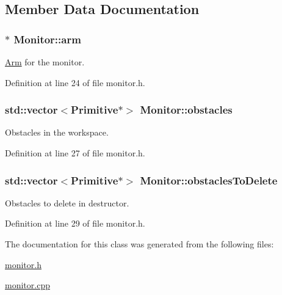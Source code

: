 \subsection{Member Data Documentation}
\subsubsection[{\texorpdfstring{arm}{arm}}]{$\ast$ Monitor\+::arm}\hypertarget{class_monitor_a8b75571f6224f999a3dc05cf9a83fa68}{}\label{class_monitor_a8b75571f6224f999a3dc05cf9a83fa68}


\hyperlink{class_arm}{Arm} for the monitor. 



Definition at line 24 of file monitor.\+h.

\subsubsection[{\texorpdfstring{obstacles}{obstacles}}]{\setlength{\rightskip}{0pt plus 5cm}std\+::vector$<${\bf Primitive}$\ast$$>$ Monitor\+::obstacles}\hypertarget{class_monitor_a05fd42482269ad65432d5400c8f0f9b5}{}\label{class_monitor_a05fd42482269ad65432d5400c8f0f9b5}


Obstacles in the workspace. 



Definition at line 27 of file monitor.\+h.

\subsubsection[{\texorpdfstring{obstacles\+To\+Delete}{obstaclesToDelete}}]{\setlength{\rightskip}{0pt plus 5cm}std\+::vector$<${\bf Primitive}$\ast$$>$ Monitor\+::obstacles\+To\+Delete}\hypertarget{class_monitor_a2207169c2b32b3bbf9925f3254064dee}{}\label{class_monitor_a2207169c2b32b3bbf9925f3254064dee}


Obstacles to delete in destructor. 



Definition at line 29 of file monitor.\+h.



The documentation for this class was generated from the following files\+:\begin{DoxyCompactItemize}
\item 
\hyperlink{monitor_8h}{monitor.\+h}\item 
\hyperlink{monitor_8cpp}{monitor.\+cpp}\end{DoxyCompactItemize}
